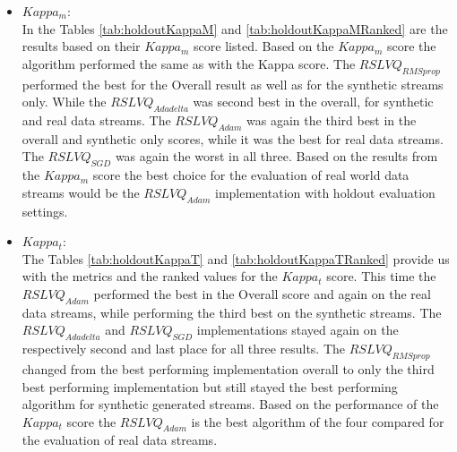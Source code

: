 \documentclass[12pt,oneside,a4paper,parskip]{scrbook}
\begin{document}
\begin{itemize}
  \item \textbf{$Kappa_m$}: \\
        In the Tables \ref{tab:holdoutKappaM} and \ref{tab:holdoutKappaMRanked} are the results based on their $Kappa_m$ score listed.
        Based on the $Kappa_m$ score the algorithm performed the same as with the Kappa score. The $RSLVQ_\textit{RMSprop}$ performed the best 
        for the Overall result as well as for the synthetic streams only. While the $RSLVQ_\textit{Adadelta}$ was second best in the
        overall, for synthetic and real data streams. The $RSLVQ_\textit{Adam}$ was again the third best in the overall and synthetic only scores,
        while it was the best for real data streams.
        The $RSLVQ_\textit{SGD}$ was again the worst in all three.
        Based on the results from the $Kappa_m$ score the best choice for the evaluation of real world data streams would be the $RSLVQ_\textit{Adam}$
        implementation with holdout evaluation settings.

  \item \textbf{$Kappa_t$}: \\
        The Tables \ref{tab:holdoutKappaT} and \ref{tab:holdoutKappaTRanked} provide us with the metrics and the ranked values for the $Kappa_t$ score.
        This time the $RSLVQ_\textit{Adam}$ performed the best in the Overall score and again on the real data streams, while performing the third best on
        the synthetic streams. The $RSLVQ_\textit{Adadelta}$ and $RSLVQ_\textit{SGD}$ implementations stayed again on the respectively second and last place for 
        all three results. The $RSLVQ_\textit{RMSprop}$ changed from the best performing implementation overall to only the third best performing implementation
        but still stayed the best performing algorithm for synthetic generated streams.
        Based on the performance of the $Kappa_t$ score the $RSLVQ_\textit{Adam}$ is the best algorithm of the four compared for
        the evaluation of real data streams.


\end{itemize}
\end{document}

